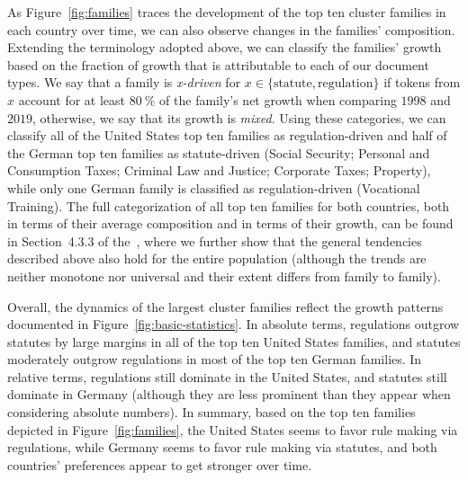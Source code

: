 As Figure~\ref{fig:families} traces the development of the top ten cluster families in each country over time, we can also observe changes in the families' composition.
Extending the terminology adopted above, we can classify the families' growth based on the fraction of growth that is attributable to each of our document types. 
We say that a family is \emph{x-driven} for $x\in \{\text{statute}, \text{regulation}\}$ if tokens from $x$ account for at least $80~\%$ of the family's net growth when comparing $1998$ and $2019$, otherwise, we say that its growth is \emph{mixed}. 
Using these categories, we can classify all of the United States top ten families as regulation-driven
and half of the German top ten families as statute-driven (Social Security; Personal and Consumption Taxes; Criminal Law and Justice; Corporate Taxes; Property), while only one German family is classified as regulation-driven (Vocational Training). 
The full categorization of all top ten families for both countries, both in terms of their average composition and in terms of their growth, can be found in Section~4.3.3 of the~\thesi, 
where we further show that the general tendencies described above also hold for the entire population (although the trends are neither monotone nor universal and their extent differs from family to family).

Overall, the dynamics of the largest cluster families reflect the growth patterns documented in Figure~\ref{fig:basic-statistics}.
In absolute terms, regulations outgrow statutes by large margins in all of the top ten United States families, and statutes moderately outgrow regulations in most of the top ten German families. 
In relative terms, regulations still dominate in the United States, 
and statutes still dominate in Germany (although they are less prominent than they appear when considering absolute numbers).
In summary, based on the top ten families depicted in Figure~\ref{fig:families}, the United States seems to favor rule making via regulations, while Germany seems to favor rule making via statutes, and both countries' preferences appear to get stronger over time.

